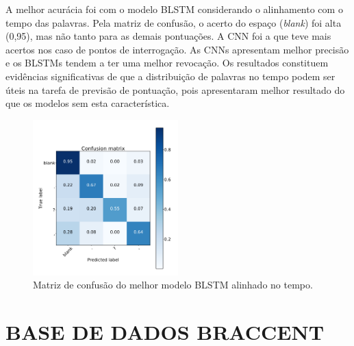 A melhor acurácia foi com o modelo BLSTM considerando o alinhamento com o tempo das palavras. Pela matriz de confusão, o acerto do espaço (\textit{blank}) foi alta (0,95), mas não tanto para as demais pontuações. A CNN foi a que teve mais acertos nos caso de pontos de interrogação. As CNNs apresentam melhor precisão e os BLSTMs tendem a ter uma melhor revocação.  Os resultados constituem evidências significativas de que a distribuição de palavras no tempo podem ser úteis na tarefa de previsão de pontuação, pois apresentaram melhor resultado do que os modelos sem esta característica.


\begin{figure}[h!]
\centering
\caption{Matriz de confusão do melhor modelo BLSTM alinhado no tempo.}
\label{fig:pontos}
\includegraphics[width=0.5\textwidth]{images/matrzi.png}
\end{figure}

\section{BASE DE DADOS BRACCENT}

